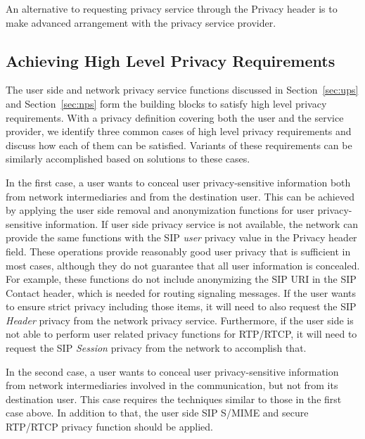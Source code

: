 \documentclass[letterpaper,notitlepage,times,12pt]{article}
\begin{document}
An alternative to requesting privacy service through the {\sf Privacy} header is to make advanced arrangement with the privacy service provider.

\subsection{Achieving High Level Privacy Requirements} \label{sec:achieve}

The user side and network privacy service functions discussed in Section~\ref{sec:ups} and Section~\ref{sec:nps} form the building blocks to satisfy high level privacy requirements. With a privacy definition covering both the user and the service provider, we identify three common cases of high level privacy requirements and discuss how each of them can be satisfied. Variants of these requirements can be similarly accomplished based on solutions to these cases.


In the first case, a user wants to conceal user privacy-sensitive information both from network intermediaries and from the destination user. This can be achieved by applying the user side removal and anonymization functions for user privacy-sensitive information. If user side privacy service is not available, the network can provide the same functions with the SIP {\it user} privacy value in the {\sf Privacy} header field. These operations provide reasonably good user privacy that is sufficient in most cases, although they do not guarantee that all user information is concealed. For example, these functions do not include anonymizing the SIP URI in the SIP {\sf Contact} header, which is needed for routing signaling messages. If the user wants to ensure strict privacy including those items, it will need to also request the SIP {\it Header} privacy from the network privacy service. Furthermore, if the user side is not able to perform user related privacy functions for RTP/RTCP, it will need to request the SIP {\it Session} privacy from the network to accomplish that.

In the second case, a user wants to conceal user privacy-sensitive information from network intermediaries involved in the communication, but not from its destination user. This case requires the techniques similar to those in the first case above. In addition to that, the user side SIP S/MIME and secure RTP/RTCP privacy function should be applied.
\end{document}
